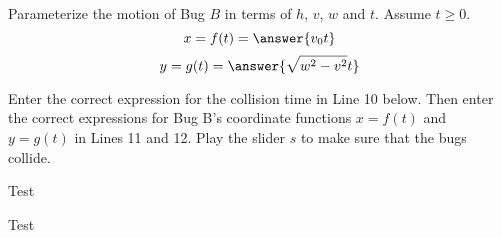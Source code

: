 \documentclass{ximera}
\begin{document}
\begin{question}
Parameterize the motion of Bug $B$ in terms of $h$, $v$, $w$ and $t$. Assume $t\geq 0$.
\[
        x = f(t)   =  \answer{v_0 t}
\]
\[
      y = g(t) = \answer{\sqrt{w^2-v^2}t}
\]
    \end{question}

\begin{exploration}\label{exp:pc1c}
Enter the correct expression for the collision time in Line 10 below. Then enter the correct expressions for Bug B's coordinate functions $x=f(t)$ and $y=g(t)$ in Lines 11 and 12. Play the slider $s$ to make sure that the bugs collide.

 
\begin{onlineOnly}
    \begin{center}
\end{center}
\end{onlineOnly}
\end{exploration}


\begin{example}
Test
\end{example}


\begin{explanation}
Test
\end{explanation}


\end{document}
